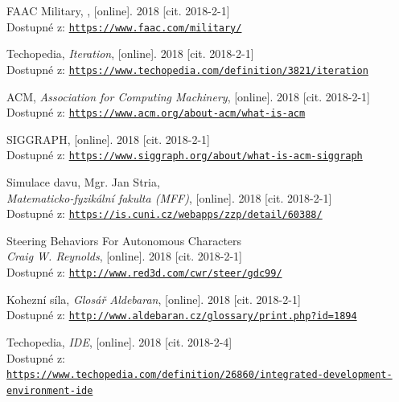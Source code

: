 \documentclass[czech,public,dept460,male,cpdeclaration]{diploma}
\begin{document}
\begin{thebibliography}{99}
	 FAAC Military,
		, [online]. 2018 [cit. 2018-2-1]\\
		Dostupné z: \href{https://www.faac.com/military/}{\texttt{https://www.faac.com/military/}}
		
	 Techopedia,
		\textit{Iteration}, [online]. 2018 [cit. 2018-2-1]\\
		Dostupné z: \href{https://www.techopedia.com/definition/3821/iteration}{\texttt{https://www.techopedia.com/definition/3821/iteration}}
		
	 ACM,
		\textit{Association for Computing Machinery}, [online]. 2018 [cit. 2018-2-1]\\
		Dostupné z: \href{https://www.acm.org/about-acm/what-is-acm}{\texttt{https://www.acm.org/about-acm/what-is-acm}}
		
	 SIGGRAPH, [online]. 2018 [cit. 2018-2-1]\\
		Dostupné z: \href{https://www.siggraph.org/about/what-is-acm-siggraph}{\texttt{https://www.siggraph.org/about/what-is-acm-siggraph}}
		
	 Simulace davu, Mgr. Jan Stria,\\
		\textit{Matematicko-fyzikální fakulta (MFF)}, [online]. 2018 [cit. 2018-2-1]\\
		Dostupné z: \href{https://is.cuni.cz/webapps/zzp/detail/60388/}{\texttt{https://is.cuni.cz/webapps/zzp/detail/60388/}}
		
	 Steering Behaviors For Autonomous Characters\\
		\textit{Craig W. Reynolds}, [online]. 2018 [cit. 2018-2-1]\\
		Dostupné z: \href{http://www.red3d.com/cwr/steer/gdc99/}{\texttt{http://www.red3d.com/cwr/steer/gdc99/}}
		
	 Kohezní síla,
		\textit{Glosář Aldebaran}, [online]. 2018 [cit. 2018-2-1]\\
		Dostupné z: \href{http://www.aldebaran.cz/glossary/print.php?id=1894}{\texttt{http://www.aldebaran.cz/glossary/print.php?id=1894}}
		
	 Techopedia,
		\textit{IDE}, [online]. 2018 [cit. 2018-2-4]\\
		Dostupné z:\\ \href{https://www.techopedia.com/definition/26860/integrated-development-environment-ide}{\texttt{https://www.techopedia.com/definition/26860/integrated-development-environment-ide}}
		

\end{thebibliography}
\end{document}
